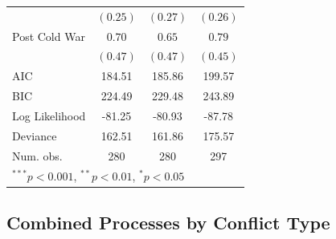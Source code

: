 \documentclass[12pt,]{book}
\let\origtable\table
\let\endorigtable\endtable
\renewenvironment{table}[1][2] {
    \singlespacing
    \expandafter\origtable\expandafter[H]
} {
    \endorigtable
}
\theoremstyle{definition}
\theoremstyle{definition}
\theoremstyle{definition}
\theoremstyle{remark}
\begin{document}
\begin{table}
\begin{center}
\begin{tabular}{l c c c }
                                        & $(0.25)$     & $(0.27)$     & $(0.26)$     \\
Post Cold War                           & $0.70$       & $0.65$       & $0.79$       \\
                                        & $(0.47)$     & $(0.47)$     & $(0.45)$     \\
\hline
AIC                                     & 184.51       & 185.86       & 199.57       \\
BIC                                     & 224.49       & 229.48       & 243.89       \\
Log Likelihood                          & -81.25       & -80.93       & -87.78       \\
Deviance                                & 162.51       & 161.86       & 175.57       \\
Num. obs.                               & 280          & 280          & 297          \\
\hline
\multicolumn{4}{l}{\scriptsize{$^{***}p<0.001$, $^{**}p<0.01$, $^*p<0.05$}}
\end{tabular}
\caption{Logit Models of Multi-Rebel Conflict-Years (> 1000 Fatalities Only)}
\label{tab:combined-war}
\end{center}
\end{table}

\hypertarget{combined-processes-by-conflict-type}{%
\subsection*{Combined Processes by Conflict
Type}\label{combined-processes-by-conflict-type}}
\end{document}
